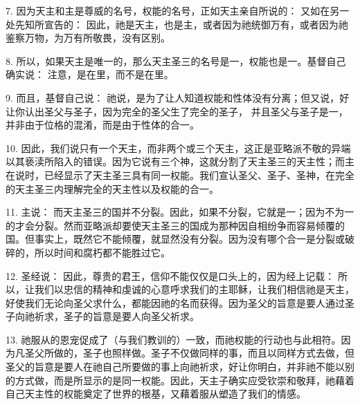 7. 因为天主和主是尊威的名号，权能的名号，正如天主亲自所说的：  又如在另一处先知所宣告的： 因此，祂是天主，也是主，或者因为祂统御万有，或者因为祂鉴察万物，为万有所敬畏，没有区别。\par

8. 所以，如果天主是唯一的，那么天主圣三的名号是一，权能也是一。基督自己确实说：  注意，是在里，而不是在里。\par

9. 而且，基督自己说：  祂说，是为了让人知道权能和性体没有分离；但又说，好让你认出圣父与圣子，因为完全的圣父生了完全的圣子， 并且圣父与圣子是一，并非由于位格的混淆，而是由于性体的合一。\par

10. 因此，我们说只有一个天主，而非两个或三个天主，这正是亚略派不敬的异端以其亵渎所陷入的错误。因为它说有三个神，这就分割了天主圣三的天主性；而主在说时，已经显示了天主圣三具有同一权能。我们宣认圣父、圣子、圣神，在完全的天主圣三内理解完全的天主性以及权能的合一。\par

11. 主说： 而天主圣三的国并不分裂。因此，如果不分裂，它就是一；因为不为一的才会分裂。然而亚略派却要使天主圣三的国成为那种因自相纷争而容易倾覆的国。但事实上，既然它不能倾覆，就显然没有分裂。因为没有哪个合一是分裂或破碎的，所以时间和腐朽都不能胜过它。\par

\par

12. 圣经说：  因此，尊贵的君王，信仰不能仅仅是口头上的，因为经上记载： 所以，让我们以忠信的精神和虔诚的心意呼求我们的主耶稣，让我们相信祂是天主，好使我们无论向圣父求什么，都能因祂的名而获得。因为圣父的旨意是要人通过圣子向祂祈求，圣子的旨意是要人向圣父祈求。\par

13. 祂服从的恩宠促成了（与我们教训的）一致，而祂权能的行动也与此相符。因为凡圣父所做的，圣子也照样做。圣子不仅做同样的事，而且以同样方式去做，但圣父的旨意是要人在祂自己所要做的事上向祂祈求，好让你明白，并非祂不能以别的方式做，而是所显示的是同一权能。因此，天主子确实应受钦崇和敬拜，祂藉着自己天主性的权能奠定了世界的根基，又藉着服从塑造了我们的情感。\par

